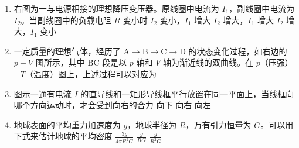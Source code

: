 \documentclass[\gkver]{gaokaozhenti}
\begin{document}
\begin{enumerate}
\item
右图为一与电源相接的理想降压变压器。原线圈中电流为 $I_{1}$，副线圈中电流为 $I_{2}$。当副线圈中的负载电阻 $R$ 变小时
\onepicture[w=4.78cm]{}
{$I_{2}$ 变小，$I_{1}$ 增大}
{$I_{2}$ 增大，$I_{1}$ 增大}
{$I_{2}$ 增大，$I_{1}$ 变小}


\gknewpage

\item
一定质量的理想气体，经历了 A$\to$B$\to$C$\to$D 的状态变化过程，如右边的 $p-V$ 图所示，其中 BC 段是以 $p$ 轴和 $V$ 轴为渐近线的双曲线。在 $p$（压强）$-T$（温度）图上，上述过程可以对应为
\onepicture[w=3.77cm]{}
\fourchoices[answer=B, ispicture=true, wA=3.82cm, wB=3.90cm, wC=3.80cm, wD=3.87cm]
{}
{}
{}
{}


\item
图示一通有电流 $I$ 的直导线和一矩形导线框平行放置在同一平面上，当线框向哪个方向运动时，才会受到向右的合力
\onepicture[h=3.48cm]{}
{向下}
{向右}
{向左}


\item
地球表面的平均重力加速度为 $g$，地球半径为 $R$，万有引力恒量为 $G$。可以用下式来估计地球的平均密度
{$\frac{3g}{4\pi R^{2}G}$}
{$\frac{g}{RG}$}
{$\frac{g}{R^{2}G}$}


\end{enumerate}
\end{document}
